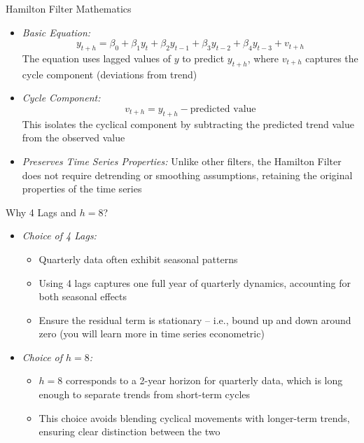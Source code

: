 \documentclass[aspectratio=1610]{beamer}
\begin{document}
\begin{frame}[wide]{Hamilton Filter Mathematics}
	\begin{itemize}
		\item \textit{Basic Equation:} 
		\[
		y_{t+h} = \beta_0 + \beta_1 y_t + \beta_2 y_{t-1} + \beta_3 y_{t-2} + \beta_4 y_{t-3} + v_{t+h}
		\]
		The equation uses lagged values of \( y \) to predict \( y_{t+h} \), where \( v_{t+h} \) captures the cycle component (deviations from trend)
		
		\item \textit{Cycle Component:} 
		\[
		v_{t+h} = y_{t+h} - \text{predicted value}
		\]
		This isolates the cyclical component by subtracting the predicted trend value from the observed value
		
		\item \textit{Preserves Time Series Properties:} Unlike other filters, the Hamilton Filter does not require detrending or smoothing assumptions, retaining the original properties of the time series

	\end{itemize}
\end{frame}


\begin{frame}[wide]{Why 4 Lags and \( h = 8 \)?}
	\begin{itemize}
		\item \textit{Choice of 4 Lags:}
		\begin{itemize}
			\item Quarterly data often exhibit seasonal patterns 
			\item Using 4 lags captures one full year of quarterly dynamics, accounting for both seasonal effects
			\item Ensure the residual term is stationary -- i.e., bound up and down around zero (you will learn more in time series econometric)
		\end{itemize}
		
		\item \textit{Choice of \( h = 8 \):}
		\begin{itemize}
			\item \( h = 8 \) corresponds to a 2-year horizon for quarterly data, which is long enough to separate trends from short-term cycles
			\item This choice avoids blending cyclical movements with longer-term trends, ensuring clear distinction between the two

		\end{itemize}
	\end{itemize}
\end{frame}
\end{document}
